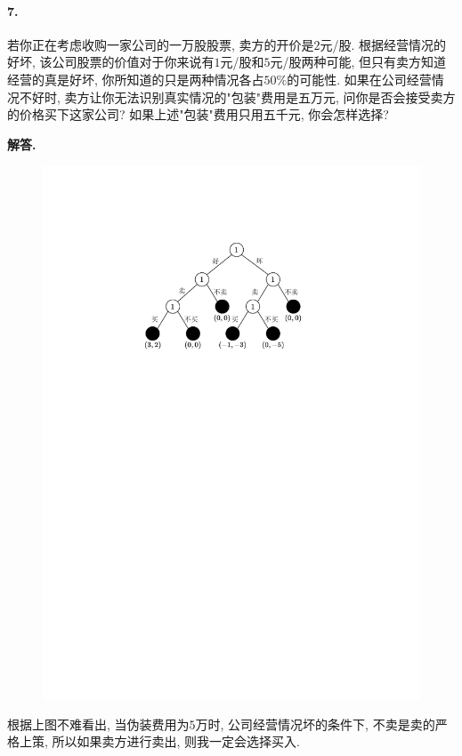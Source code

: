 \documentclass[12pt, a4paper, oneside]{ctexart}
\newenvironment{solution}{\par\noindent\textbf{解答. }}{\bigskip\par}
\begin{document}
\paragraph{7.}若你正在考虑收购一家公司的一万股股票, 卖方的开价是$2$元/股. 根据经营情况的好坏, 该公司股票的价值对于你来说有$1$元/股和$5$元/股两种可能, 但只有卖方知道经营的真是好坏, 你所知道的只是两种情况各占$50\%$的可能性. 如果在公司经营情况不好时, 卖方让你无法识别真实情况的"包装"费用是五万元, 问你是否会接受卖方的价格买下这家公司? 如果上述"包装"费用只用五千元, 你会怎样选择?
\begin{solution}
    \begin{figure}[htbp]
        \centering
        \includegraphics[scale=0.8]{5.7.pdf}
    \end{figure}
    根据上图不难看出, 当伪装费用为$5$万时, 公司经营情况坏的条件下, 不卖是卖的严格上策, 所以如果卖方进行卖出, 则我一定会选择买入.
    \begin{figure}[htbp]

\end{figure}
\end{solution}
\end{document}
